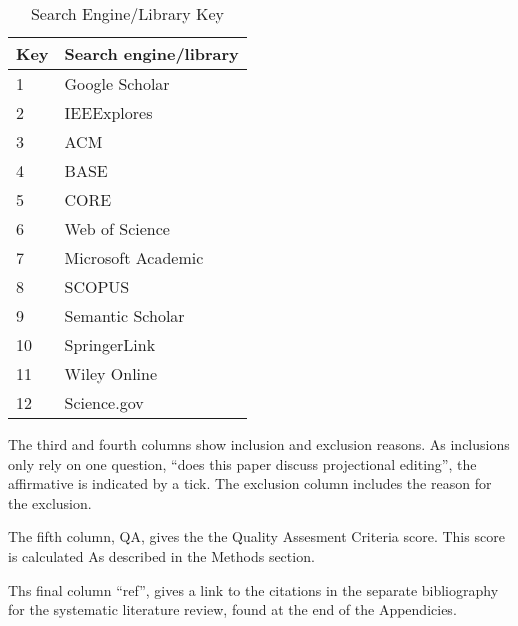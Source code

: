 \begin{table}[h]
    \begin{center}
        \begin{tabular}{ | l | l |} 
            \hline
            Key & Search engine/library     \\
            \hline
            \hline
            1  & Google Scholar             \\
            2  & IEEExplores                \\
            3  & ACM                        \\
            4  & BASE                       \\
            5  & CORE                       \\
            6  & Web of Science             \\
            7  & Microsoft Academic         \\
            8  & SCOPUS                     \\
            9  & Semantic Scholar           \\
            10 & SpringerLink               \\
            11 & Wiley Online               \\
            12 & Science.gov                \\
            \hline
        \end{tabular}
    \end{center}
    \caption{Search Engine/Library Key}
    \label{table:SearchEngineKey}
\end{table}

The third and fourth columns show inclusion and exclusion reasons.
As inclusions only rely on one question, ``does this paper discuss projectional editing'', the affirmative is indicated by a tick.
The exclusion column includes the reason for  the exclusion.

The fifth column, QA, gives the the Quality Assesment Criteria score.
This score is calculated As described in the Methods section.

Ths final column ``ref'', gives a link to the citations in the separate bibliography for the systematic literature review, found at the end of the Appendicies.




